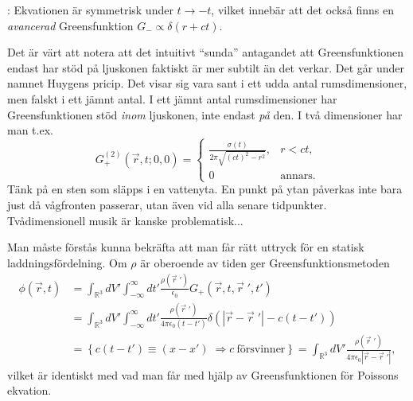 \documentclass[%
oneside,                 %
final,                   %
10pt]{article}
\newcommand{\longinlinecomment}[3]{{\color{red}{\bf #1}: #2}}
\newenvironment{warning_mdfboxadmon}[1][]{
\begin{warning_mdfboxmdframed}[frametitle=#1]
}
{
\end{warning_mdfboxmdframed}
}
\begin{document}
\noindent
\longinlinecomment{Kommentar 5}{ Ekvationen är symmetrisk under $t \to -t$, vilket innebär att det också finns en \emph{avancerad} Greensfunktion $G_- \propto \delta(r+ct)$. }{ Ekvationen är symmetrisk under }


\begin{warning_mdfboxadmon}
Det är värt att notera att det intuitivt ``sunda'' antagandet att Greensfunktionen endast har stöd på ljuskonen faktiskt är mer subtilt än det verkar. Det går under namnet Huygens pricip. Det visar sig vara sant i ett udda antal rumsdimensioner, men falskt i ett jämnt antal. I ett jämnt antal rumsdimensioner har Greensfunktionen stöd \emph{inom} ljuskonen, inte endast \emph{på} den.
I två dimensioner har man t.ex.
$$
G_+^{(2)}(\vec{r},t;0,0)=
\left\{ 
\begin{array}{ll}
\frac{\sigma(t)}{2\pi\sqrt{(ct)^2-r^2}}, & r<ct, \\
0 & \mathrm{annars.}
\end{array}
\right.
$$
Tänk på en sten som släpps i en vattenyta. En punkt på ytan påverkas inte bara just då vågfronten passerar, utan även vid alla senare tidpunkter. Tvådimensionell musik är kanske problematisk...
\end{warning_mdfboxadmon} %



Man måste förstås kunna bekräfta att man får rätt uttryck för en statisk laddningsfördelning. Om $\rho$ är oberoende av tiden ger Greensfunktionsmetoden
\begin{align*}
\phi(\vec{r},t) &= 
\int_{\mathbb{R}^3}dV' \int_{-\infty}^\infty dt'
\frac{\rho(\vec{r}{\;}')}{\epsilon_0} G_+(\vec{r},t,\vec{r}{\;}',t') \\
&= \int_{\mathbb{R}^3}dV' \int_{-\infty}^\infty dt'
\frac{\rho(\vec{r}{\;}')}{4\pi\epsilon_0(t-t')} \delta(|\vec{r}-\vec{r}{\;}'|-c(t-t')) \\
&= \left\{ c(t-t') \equiv (x-x') \; \Rightarrow c \mathrm{~försvinner} \right\} =\int_{\mathbb{R}^3}dV'
\frac{\rho(\vec{r}{\;}')}{4\pi\epsilon_0|\vec{r}-\vec{r}{\;}'|},
\end{align*}
vilket är identiskt med vad man får med hjälp av Greensfunktionen för Poissons ekvation.



\end{document}
